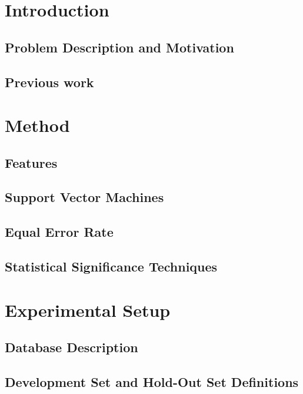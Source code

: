 \documentclass[11pt,a4paper]{tesis}
\begin{document}
\linespread{1.6}
\tableofcontents
\chapter{Introduction}
	\section{Problem Description and Motivation}
		
	\section{Previous work}
		
\chapter{Method}
	
	\section{Features}
		
		
		
	\section{Support Vector Machines}
		
	\section{Equal Error Rate}
		
	\section{Statistical Significance Techniques}
		
		

\chapter{Experimental Setup}
	
	\section{Database Description}
		
	\section{Development Set and Hold-Out Set Definitions}
		
\end{document}
